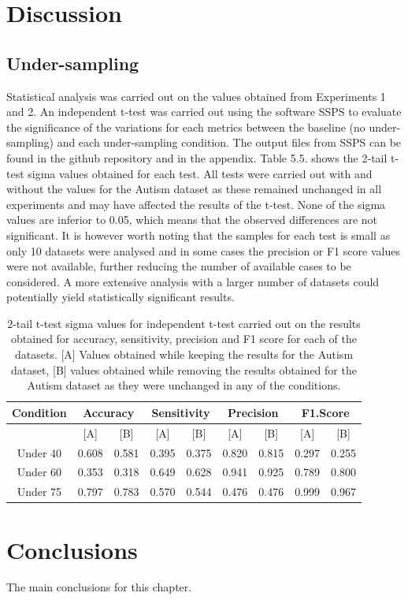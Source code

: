 \section{Discussion}
\subsection{Under-sampling}
Statistical analysis was carried out on the values obtained from Experiments 1 and 2. An independent t-test was carried out using the software SSPS to evaluate the significance of the variations for each metrics between the baseline (no under-sampling) and each under-sampling condition.\newline
The output files from SSPS can be found in the github repository and in the appendix. Table 5.5. shows the 2-tail t-test sigma values obtained for each test. All tests were carried out with and without the values for the Autism dataset as these remained unchanged in all experiments and may have affected the results of the t-test.
None of the sigma values are inferior to 0.05, which means that the observed differences are not significant. It is however worth noting that the samples for each test is small as only 10 datasets were analysed and in some cases the precision or F1 score values were not available, further reducing the number of available cases to be considered. A more extensive analysis with a larger number of datasets could potentially yield statistically significant results.\newline

\begin{table}[!htbp]
\centering
\begin{tabular}{*9c}
  \hline
  \rowcolor{LightCyan}
Condition &\multicolumn{2}{c}{Accuracy} &\multicolumn{2}{c}{Sensitivity} &\multicolumn{2}{c}{Precision}&\multicolumn{2}{c}{F1.Score}\\
  \hline
           & [A] & [B] & [A] & [B] & [A] & [B] & [A] & [B] \\
Under 40  &0.608& 0.581& 0.395 & 0.375 & 0.820 & 0.815 & 0.297 & 0.255 \\ 
  Under 60 &0.353& 0.318& 0.649 & 0.628 & 0.941 & 0.925 & 0.789 & 0.800 \\ 
  Under 75 &0.797&0.783 & 0.570 & 0.544 & 0.476 & 0.476 & 0.999 & 0.967 \\ 
   \hline
\end{tabular}
\caption{2-tail t-test sigma values for independent t-test carried out on the results obtained for accuracy, sensitivity, precision and F1 score for each of the datasets. [A] Values obtained while keeping the results for the Autism dataset, [B] values obtained while removing the results obtained for the Autism dataset as they were unchanged in any of the conditions.}
\end{table}








 

\section{Conclusions}

The main conclusions for this chapter.


